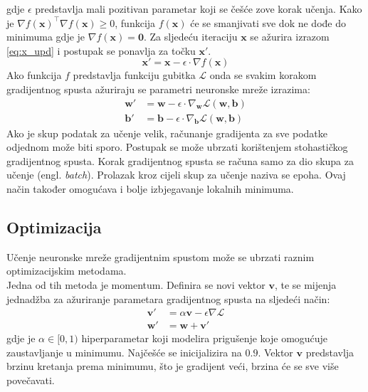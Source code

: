 \documentclass[times, utf8, zavrsni, numeric]{fer}
\renewcommand{\vec}[1]{\mathbf{#1}}
\begin{document}
gdje $\epsilon$ predstavlja mali pozitivan parametar koji se češće zove
korak učenja. Kako je $\nabla f(\vec{x})^\top \nabla f(\vec{x}) \geq 0$,
funkcija $f(\vec{x})$ će se smanjivati sve dok ne dođe do minimuma gdje je
$\nabla f(\vec{x}) = \vec{0}$. Za sljedeću iteraciju $\vec{x}$ se ažurira 
izrazom \ref{eq:x_upd} i postupak se ponavlja za točku $\vec{x}'$.
\begin{equation}
	\vec{x}' = \vec{x} - \epsilon\cdot \nabla f(\vec{x})
	\label{eq:x_upd}
\end{equation}
\indent Ako funkcija $f$ predstavlja funkciju gubitka $\mathcal{L}$ 
onda se svakim korakom
gradijentnog spusta ažuriraju se parametri neuronske mreže izrazima:
\begin{align}
	\vec{w}' &= \vec{w} - \epsilon \cdot \nabla_\vec{w} \mathcal{L}(\vec{w}, 
	\vec{b}) \\
	\vec{b}' &= \vec{b} - \epsilon \cdot \nabla_\vec{b} \mathcal{L}(\vec{w}, 
	\vec{b})
\end{align}
\indent Ako je skup podatak za učenje velik, računanje gradijenta za sve podatke
odjednom može biti sporo. Postupak se može ubrzati korištenjem stohastičkog
gradijentnog spusta. Korak gradijentnog spusta se računa samo za dio skupa za 
učenje (engl. \textit{batch}). Prolazak kroz cijeli skup za učenje naziva se 
epoha. Ovaj način također omogućava i bolje izbjegavanje lokalnih minimuma.

\subsection{Optimizacija}
Učenje neuronske mreže gradijentnim spustom može se ubrzati raznim 
optimizacijskim metodama. 
\\\indent Jedna od tih metoda je momentum. Definira se novi vektor $\vec{v}$,
te se mijenja jednadžba za ažuriranje parametara gradijentnog spusta
na sljedeći način:
\begin{equation}
\begin{aligned}
	\vec{v}' &= \alpha \vec{v} - \epsilon \nabla \mathcal{L} \\
	\vec{w}' &= \vec{w} + \vec{v}'
\end{aligned}
\end{equation}
gdje je $\alpha \in [0, 1)$ hiperparametar koji modelira prigušenje koje
omogućuje zaustavljanje u minimumu. Najčešće se inicijalizira na $0.9$. 
Vektor $\vec{v}$ predstavlja brzinu kretanja prema minimumu, što je gradijent
veći, brzina će se sve više povečavati.
\end{document}
